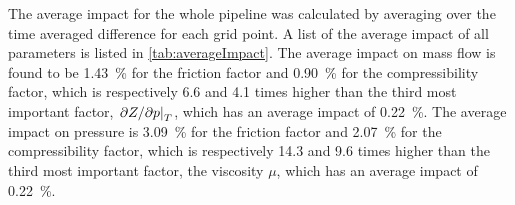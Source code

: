 The average impact for the whole pipeline was calculated by averaging over the time averaged difference for each grid point. %
A list of the average impact of all parameters is listed in \cref{tab:averageImpact}. %
%
The average impact on mass flow is found to be \SI{1.43}{\percent} for the friction factor and \SI{0.90}{\percent} for the compressibility factor, %
which is respectively 6.6 and 4.1 times higher than the third most important factor, $\eval{\partial Z/\partial p}_T$, which has an average impact of \SI{0.22}{\percent}. %
%
The average impact on pressure is \SI{3.09}{\percent} for the friction factor and \SI{2.07}{\percent} for the compressibility factor, %
which is respectively 14.3 and 9.6 times higher than the third most important factor, the viscosity $\mu$, which has an average impact of \SI{0.22}{\percent}. %
%

